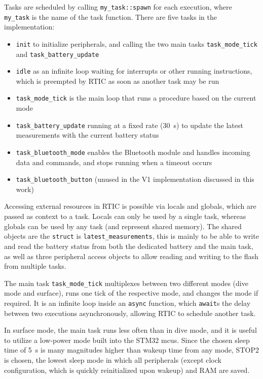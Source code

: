 Tasks are scheduled by calling \lstinline{my_task::spawn} for each execution, where \lstinline{my_task} is the name of the task function. There are five tasks in the implementation:

\begin{itemize}
    \item \lstinline{init} to initialize peripherals, and calling the two main tasks \lstinline{task_mode_tick} and \lstinline{task_battery_update}
    \item \lstinline{idle} as an infinite loop waiting for interrupts or other running instructions, which is preempted by RTIC as soon as another task may be run
    \item \lstinline{task_mode_tick} is the main loop that runs a procedure based on the current mode
    \item \lstinline{task_battery_update} running at a fixed rate (\SI{30}{\second}) to update the latest measurements with the current battery status
    \item \lstinline{task_bluetooth_mode} enables the Bluetooth module and handles incoming data and commands, and stops running when a timeout occurs
    \item \lstinline{task_bluetooth_button} (unused in the V1 implementation discussed in this work)
\end{itemize}

Accessing external resources in RTIC is possible via locals and globals, which are passed as context to a task. Locals can only be used by a single task, whereas globals can be used by any task (and represent shared memory). 
The shared objects are the \lstinline{struct} is \lstinline{latest_measurements}, this is mainly to be able to write and read the battery status from both the dedicated battery and the main task, as well as three peripheral access objects to allow reading and writing to the flash from multiple tasks.

The main task \lstinline{task_mode_tick} multiplexes between two different modes (dive mode and surface), runs one tick of the respective mode, and changes the mode if required.
It is an infinite loop inside an \lstinline{async} function, which \lstinline{await}s the delay between two executions asynchronously, allowing RTIC to schedule another task.

In surface mode, the main task runs less often than in dive mode, and it is useful to utilize a low-power mode built into the STM32 \gls{mcu}s.
Since the chosen sleep time of \SI{5}{\second} is many magnitudes higher than wakeup time from any mode, STOP2 is chosen, the lowest sleep mode in which all peripherals (except clock configuration, which is quickly reinitialized upon wakeup) and RAM are saved.

